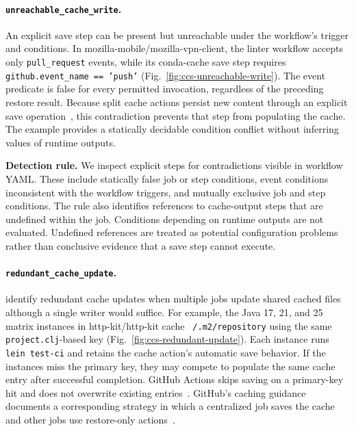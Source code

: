 \documentclass[smallextended]{svjour3}
\begin{document}
\paragraph{\texttt{unreachable\_cache\_write}.}
An explicit save step can be present but unreachable under the workflow's trigger and conditions. In mozilla-mobile/mozilla-vpn-client, the linter workflow accepts only \texttt{pull\_request} events, while its conda-cache save step requires \texttt{github.event\_name == 'push'} (Fig.~\ref{fig:ccs-unreachable-write}). The event predicate is false for every permitted invocation, regardless of the preceding restore result. Because split cache actions persist new content through an explicit save operation~\citep{gha_cache_action,gha_cache_strategies}, this contradiction prevents that step from populating the cache. The example provides a statically decidable condition conflict without inferring values of runtime outputs.

\textbf{Detection rule.}
We inspect explicit  steps for contradictions visible in workflow YAML. These include statically false job or step conditions, event conditions inconsistent with the workflow triggers, and mutually exclusive job and step conditions. The rule also identifies references to cache-output steps that are undefined within the job. Conditions depending on runtime outputs are not evaluated. Undefined references are treated as potential configuration problems rather than conclusive evidence that a save step cannot execute.




\FloatBarrier
\paragraph{\texttt{redundant\_cache\_update}.}
\citet{urdih2026cache} identify redundant cache updates when multiple jobs update shared cached files although a single writer would suffice. For example, the Java 17, 21, and 25 matrix instances in http-kit/http-kit cache \texttt{\string~/.m2/repository} using the same \texttt{project.clj}-based key (Fig.~\ref{fig:ccs-redundant-update}). Each instance runs \texttt{lein test-ci} and retains the cache action's automatic save behavior. If the instances miss the primary key, they may compete to populate the same cache entry after successful completion. GitHub Actions skips saving on a primary-key hit and does not overwrite existing entries~\citep{gha_cache_action,gha_cache_docs}. GitHub's caching guidance documents a corresponding strategy in which a centralized job saves the cache and other jobs use restore-only actions~\citep{gha_cache_strategies}.
\end{document}
